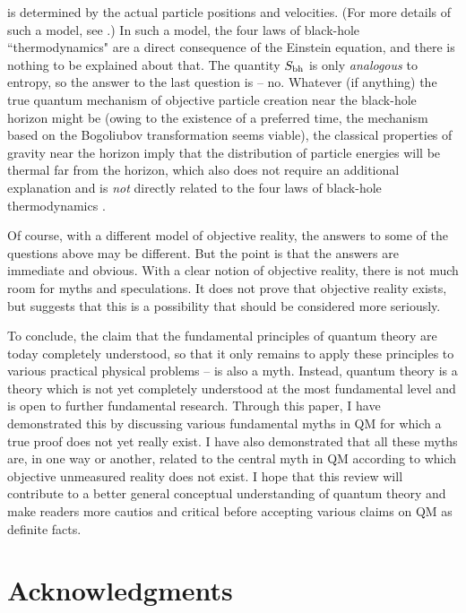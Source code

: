 \documentclass[12pt]{article}
\begin{document}
is determined by the actual particle positions and velocities. 
(For more details of such a model, see \cite{niksemicl}.)
In such a model,
the four laws of black-hole ``thermodynamics" are a direct consequence 
of the Einstein equation, and there is nothing to be explained 
about that. The quantity $S_{\rm bh}$ is only {\em analogous}
to entropy, so the answer to the last question is -- no.
Whatever (if anything) the true quantum mechanism of objective 
particle creation near the black-hole horizon might be 
(owing to the existence of a preferred time, the mechanism based 
on the Bogoliubov transformation seems viable), 
the classical properties of gravity near the horizon imply
that the distribution of particle energies will be thermal
far from the horizon, which also does not require an additional 
explanation and is {\em not} directly related to the 
four laws of black-hole thermodynamics \cite{viss}.

Of course, with a different model of objective reality, the answers
to some of the questions above may be different. But the point is 
that the answers are immediate and obvious. With 
a clear notion of objective reality, there is not much room for 
myths and speculations. It does not prove that objective reality 
exists, but suggests that this is a possibility that
should be considered more seriously. 

To conclude, the claim that the fundamental principles
of quantum theory are today completely understood, so that it only
remains to apply these principles to various practical physical problems --
is also a myth. Instead, quantum theory is a theory which is not yet
completely understood at the most fundamental level and is open
to further fundamental research. Through this paper, I have
demonstrated this by discussing various fundamental myths in QM for which
a true proof does not yet really exist. I have also demonstrated 
that all these myths are, in one way or another, related to the 
central myth in QM according to which objective unmeasured reality
does not exist. I hope that this review will contribute to a 
better general conceptual understanding of quantum theory and make readers 
more cautios and critical before accepting various claims 
on QM as definite facts.  
 



\section{Acknowledgments}
\end{document}
